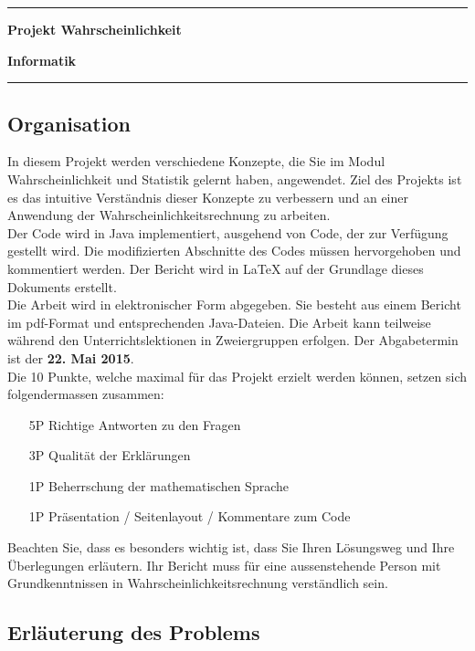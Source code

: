 \documentclass[12pt,a4paper]{article}
\begin{document}
\hrule
{\bfseries\large Projekt Wahrscheinlichkeit} \rule[-1.5ex]{0pt}{5ex}  \hfill {\bfseries\large Informatik}
\hrule
\vspace{5ex}

\subsection*{Organisation} 

In diesem Projekt werden verschiedene Konzepte, die Sie im Modul Wahrscheinlichkeit und Statistik gelernt haben, 
angewendet. Ziel des Projekts ist es das intuitive Verständnis dieser Konzepte zu verbessern und an einer
Anwendung der Wahrscheinlichkeitsrechnung zu arbeiten.\\

Der Code wird in Java implementiert, ausgehend von Code, der zur Verfügung gestellt wird. Die modifizierten Abschnitte des Codes müssen hervorgehoben und kommentiert werden. Der Bericht wird in LaTeX auf der Grundlage dieses Dokuments erstellt.\\

Die Arbeit wird in elektronischer Form abgegeben. Sie besteht aus einem Bericht im pdf-Format und entsprechenden Java-Dateien. Die Arbeit kann teilweise während den Unterrichtslektionen in Zweiergruppen erfolgen. Der
Abgabetermin ist der \textbf{22. Mai 2015}.\\

Die 10 Punkte, welche maximal für das Projekt erzielt werden können, setzen sich folgendermassen 
zusammen:
\begin{enumerate}
\item[5P] Richtige Antworten zu den Fragen
\item[3P] Qualität der Erklärungen
\item[1P] Beherrschung der mathematischen Sprache
\item[1P] Präsentation / Seitenlayout / Kommentare zum Code
\end{enumerate} 

Beachten Sie, dass es besonders wichtig ist, dass Sie Ihren Lösungsweg und Ihre Überlegungen erläutern. 
Ihr Bericht muss für eine aussenstehende Person mit Grundkenntnissen in Wahrscheinlichkeitsrechnung verständlich sein.

\subsection*{Erläuterung des Problems}
\end{document}
